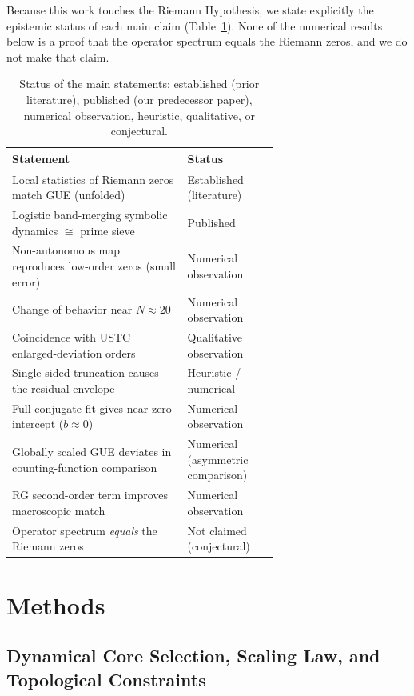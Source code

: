 \documentclass[fleqn,10pt]{wlscirep}
\begin{document}
Because this work touches the Riemann Hypothesis, we state explicitly the
epistemic status of each main claim (Table~\ref{tab:claims}). None of the
numerical results below is a proof that the operator spectrum equals the
Riemann zeros, and we do not make that claim.

\begin{table}[ht]
\centering
\begin{tabular}{p{0.66\linewidth}l}
\hline
Statement & Status \\
\hline
Local statistics of Riemann zeros match GUE (unfolded) & Established (literature) \\
Logistic band-merging symbolic dynamics $\cong$ prime sieve & Published \cite{wang2026} \\
Non-autonomous map reproduces low-order zeros (small error) & Numerical observation \\
Change of behavior near $N\approx20$ & Numerical observation \\
Coincidence with USTC enlarged-deviation orders & Qualitative observation \\
Single-sided truncation causes the residual envelope & Heuristic / numerical \\
Full-conjugate fit gives near-zero intercept ($b\approx0$) & Numerical observation \\
Globally scaled GUE deviates in counting-function comparison & Numerical (asymmetric comparison) \\
RG second-order term improves macroscopic match & Numerical observation \\
Operator spectrum \emph{equals} the Riemann zeros & Not claimed (conjectural) \\
\hline
\end{tabular}
\caption{\label{tab:claims}Status of the main statements: established (prior literature), published (our predecessor paper), numerical observation, heuristic, qualitative, or conjectural.}
\end{table}

\section*{Methods}

\subsection*{Dynamical Core Selection, Scaling Law, and Topological Constraints}
\end{document}
